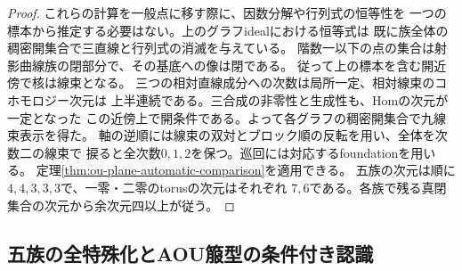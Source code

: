 \begin{proof}
これらの計算を一般点に移す際に、因数分解や行列式の恒等性を
一つの標本から推定する必要はない。上のグラフidealにおける恒等式は
既に族全体の稠密開集合で三直線と行列式の消滅を与えている。
階数一以下の点の集合は射影曲線族の閉部分で、その基底への像は閉である。
従って上の標本を含む開近傍で核は線束となる。
三つの相対直線成分への次数は局所一定、相対線束のコホモロジー次元は
上半連続である。三合成の非零性と生成性も、Homの次元が一定となった
この近傍上で開条件である。よって各グラフの稠密開集合で九線束表示を得た。
軸の逆順には線束の双対とブロック順の反転を用い、全体を次数二の線束で
捩ると全次数$0,1,2$を保つ。巡回には対応するfoundationを用いる。
定理\ref{thm:ou-plane-automatic-comparison}を適用できる。
五族の次元は順に$4,4,3,3,3$で、一零・二零のtorusの次元はそれぞれ
$7,6$である。各族で残る真閉集合の次元から余次元四以上が従う。
\end{proof}

\subsection{五族の全特殊化とAOU箙型の条件付き認識}
\label{subsec:ou-all-foundations-conditional}

